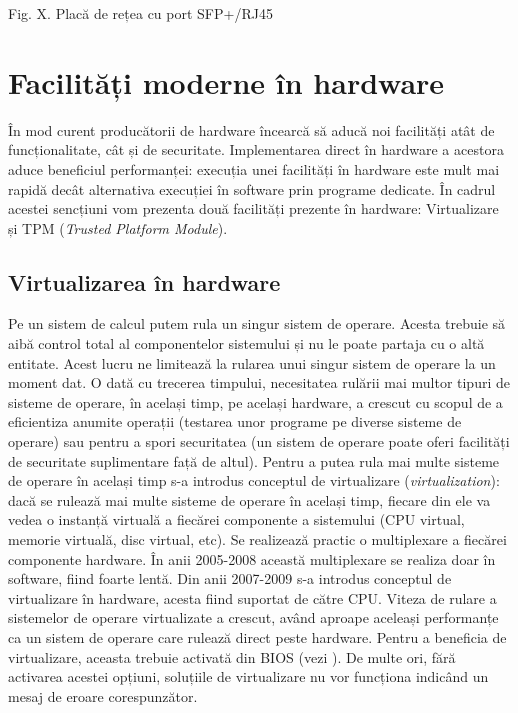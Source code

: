 Fig. X. Placă de rețea cu port SFP+/RJ45

\section{Facilități moderne în hardware}
\label{sec:hardware-functionalitati}

În mod curent producătorii de hardware încearcă să aducă noi facilități atât de
funcționalitate, cât și de securitate. Implementarea direct în hardware a
acestora aduce beneficiul performanței: execuția unei facilități în hardware
este mult mai rapidă decât alternativa execuției în software prin programe
dedicate. În cadrul acestei sencțiuni vom prezenta două facilități prezente în
hardware: Virtualizare și TPM 
(\textit{Trusted Platform Module}).

\subsection{Virtualizarea în hardware}
\label{sec:hardware-functionalitati-virt}

Pe un sistem de calcul putem rula un singur sistem de operare. Acesta trebuie să
aibă control total al componentelor sistemului și nu le poate partaja cu o altă
entitate. Acest lucru ne limitează la rularea unui singur sistem de operare la
un moment dat. O dată cu trecerea timpului, necesitatea rulării mai multor
tipuri de sisteme de operare, în același timp, pe același hardware, a crescut cu
scopul de a eficientiza anumite operații (testarea unor programe pe diverse
sisteme de operare) sau pentru a spori securitatea (un sistem de operare poate
oferi facilități de securitate suplimentare față de altul). Pentru a putea rula
mai multe sisteme de operare în același timp s-a introdus conceptul de
virtualizare (\textit{virtualization}): dacă se rulează mai multe sisteme de
operare în același timp, fiecare din ele va vedea o instanță virtuală a fiecărei
componente a sistemului (CPU virtual, memorie virtuală, disc virtual, etc). Se
realizează practic o multiplexare a fiecărei componente hardware. În anii
2005-2008 această multiplexare se realiza doar în software, fiind foarte lentă.
Din anii 2007-2009 s-a introdus conceptul de virtualizare în hardware, acesta
fiind suportat de către CPU. Viteza de rulare a sistemelor de operare
virtualizate a crescut, având aproape aceleași performanțe ca un sistem de
operare care rulează direct peste hardware. Pentru a beneficia de virtualizare,
aceasta trebuie activată din BIOS (vezi ).
De multe ori, fără activarea acestei opțiuni, soluțiile de virtualizare nu vor
funcționa indicând un mesaj de eroare corespunzător.

